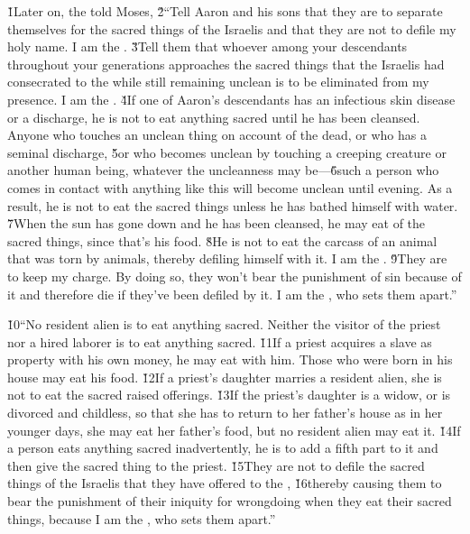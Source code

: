 \v{1}Later on, the  told Moses, \v{2}``Tell Aaron and his sons that they are to separate themselves for the sacred things of the Israelis and that they are not to defile my holy name. I am the . \v{3}Tell them that whoever among your descendants throughout your generations approaches the sacred things that the Israelis had consecrated to the  while still remaining unclean is to be eliminated from my presence. I am the . \v{4}If one of Aaron's descendants has an infectious skin disease or a discharge, he is not to eat anything sacred until he has been cleansed. Anyone who touches an unclean thing on account of the dead, or who has a seminal discharge, \v{5}or who becomes unclean by touching a creeping creature or another human being, whatever the uncleanness may be---\v{6}such a person who comes in contact with anything like this will become unclean until evening. As a result, he is not to eat the sacred things unless he has bathed himself with water. \v{7}When the sun has gone down and he has been cleansed, he may eat of the sacred things, since that's his food. \v{8}He is not to eat the carcass of an animal that was torn by animals, thereby defiling himself with it. I am the . \v{9}They are to keep my charge. By doing so, they won't bear the punishment of sin because of it and therefore die if they've been defiled by it. I am the , who sets them apart.''

\v{10}``No resident alien is to eat anything sacred. Neither the visitor of the priest nor a hired laborer is to eat anything sacred. \v{11}If a priest acquires a slave as property with his own money, he may eat with him. Those who were born in his house may eat his food. \v{12}If a priest's daughter marries a resident alien, she is not to eat the sacred raised offerings. \v{13}If the priest's daughter is a widow, or is divorced and childless, so that she has to return to her father's house as in her younger days, she may eat her father's food, but no resident alien may eat it. \v{14}If a person eats anything sacred inadvertently, he is to add a fifth part to it and then give the sacred thing to the priest. \v{15}They are not to defile the sacred things of the Israelis that they have offered to the , \v{16}thereby causing them to bear the punishment of their iniquity for wrongdoing when they eat their sacred things, because I am the , who sets them apart.''

